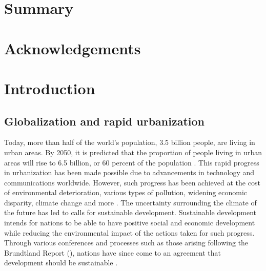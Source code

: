 \documentclass[preprint,12pt,authoryear]{elsarticle}
\begin{document}
	

	






\section*{\Large Summary}

\clearpage
\section*{\Large Acknowledgements}

\clearpage
\renewcommand{\cftfigfont}{Figure }
\renewcommand{\cfttabfont}{Table }
\tableofcontents
\clearpage

\listoffigures
\clearpage

\listoftables
\clearpage

\section{Introduction}
\subsection{Globalization and rapid urbanization}
Today, more than half of the world's population, 3.5 billion people, are living in urban areas. By 2050, it is predicted that the proportion of people living in urban areas will rise to 6.5 billion, or 60 percent of the population \citep{wup2014}. This rapid progress in urbanization has been made possible due to advancements in technology and communications worldwide. However, such progress has been achieved at the cost of environmental deterioration, various types of pollution, widening economic disparity, climate change and more \citep{dalal-clayton2002}. The uncertainty surrounding the climate of the future has led to calls for sustainable development. Sustainable development intends for nations to be able to have positive social and economic development while reducing the environmental impact of the actions taken for such progress. Through various conferences and processes such as those arising following the Brundtland Report (\citeyear{brundtland1987}), nations have since come to an agreement that development should be sustainable \citep{dalal-clayton2002}. 
\end{document}
